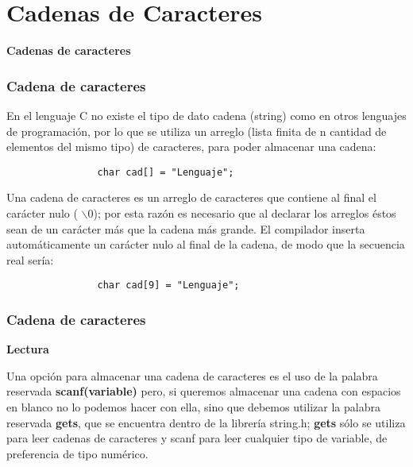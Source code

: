 \section*{Cadenas de Caracteres}

\begin{frame}[c] 
\centering
\huge \textbf{Cadenas de caracteres}
\end{frame}

\begin{frame}[t, fragile]
    \frametitle{Cadena de caracteres}
    \justify
    \hspace{5mm}En el lenguaje C no existe el tipo de dato cadena (string) como en otros lenguajes de programación, por lo que se utiliza un arreglo (lista finita de n cantidad de elementos del mismo tipo) de caracteres, para poder almacenar una cadena:
    \begin{lstlisting}
                char cad[] = "Lenguaje";
\end{lstlisting}
    \vspace{-2mm}
    \hspace{5mm}Una cadena de caracteres es un arreglo de caracteres que contiene al final el carácter nulo ( $\backslash$0); por esta razón es necesario que al declarar los arreglos éstos sean de un carácter más que la cadena más grande. El compilador inserta automáticamente un carácter nulo al final de la cadena, de modo que la secuencia real sería:
    \begin{lstlisting}
                char cad[9] = "Lenguaje";
\end{lstlisting}
\end{frame}


\begin{frame}
    \frametitle{Cadena de caracteres}
    \begin{center}\textbf{Lectura}\end{center}
    \justify
    \hspace{5mm}Una opción para almacenar una cadena de caracteres es el uso de la palabra reservada \textbf{scanf(variable)} pero, si queremos almacenar una cadena con espacios en blanco no lo podemos hacer con ella, sino que debemos utilizar la palabra reservada \textbf{gets}, que se encuentra dentro de la librería string.h; \textbf{gets} sólo se utiliza para leer cadenas de caracteres y scanf para leer cualquier tipo de variable, de preferencia de tipo numérico.
\end{frame}

